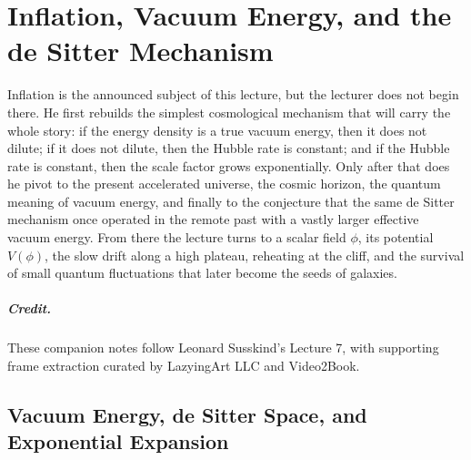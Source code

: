 \chapter{Inflation, Vacuum Energy, and the de Sitter Mechanism}

Inflation is the announced subject of this lecture, but the lecturer does not begin there. He first rebuilds the simplest cosmological mechanism that will carry the whole story: if the energy density is a true vacuum energy, then it does not dilute; if it does not dilute, then the Hubble rate is constant; and if the Hubble rate is constant, then the scale factor grows exponentially. Only after that does he pivot to the present accelerated universe, the cosmic horizon, the quantum meaning of vacuum energy, and finally to the conjecture that the same de Sitter mechanism once operated in the remote past with a vastly larger effective vacuum energy. From there the lecture turns to a scalar field \(\phi\), its potential \(V(\phi)\), the slow drift along a high plateau, reheating at the cliff, and the survival of small quantum fluctuations that later become the seeds of galaxies.

\paragraph{Credit.} These companion notes follow Leonard Susskind's Lecture 7, with supporting frame extraction curated by LazyingArt LLC and Video2Book.

\section{Vacuum Energy, de Sitter Space, and Exponential Expansion}

